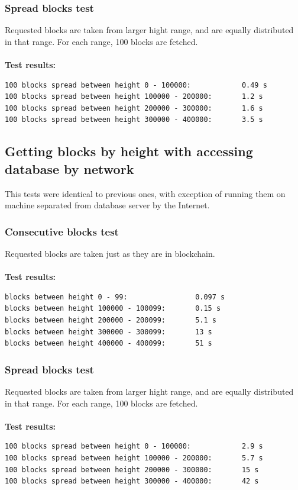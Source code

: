 \documentclass[12pt, en, eng, oneside, final]{mgr}
\begin{document}
\subsubsection{Spread blocks test}
Requested blocks are taken from larger hight range, and are equally distributed in that range. For each range, 100 blocks are fetched.
\\
\\ 
\textbf{Test results:}
\begin{verbatim}
100 blocks spread between height 0 - 100000:            0.49 s
100 blocks spread between height 100000 - 200000:       1.2 s
100 blocks spread between height 200000 - 300000:       1.6 s
100 blocks spread between height 300000 - 400000:       3.5 s
\end{verbatim}


\subsection{Getting blocks by height with accessing database by network}
This tests were identical to previous ones, with exception of running them on machine separated from database server by the Internet.

\subsubsection{Consecutive blocks test}
Requested blocks are taken just as they are in blockchain.
\\
\\
\textbf{Test results:}
\begin{verbatim}
blocks between height 0 - 99:                0.097 s
blocks between height 100000 - 100099:       0.15 s
blocks between height 200000 - 200099:       5.1 s
blocks between height 300000 - 300099:       13 s
blocks between height 400000 - 400099:       51 s
\end{verbatim}

\subsubsection{Spread blocks test}
Requested blocks are taken from larger hight range, and are equally distributed in that range. For each range, 100 blocks are fetched.
\\
\\ 
\textbf{Test results:}
\begin{verbatim}
100 blocks spread between height 0 - 100000:            2.9 s
100 blocks spread between height 100000 - 200000:       5.7 s
100 blocks spread between height 200000 - 300000:       15 s
100 blocks spread between height 300000 - 400000:       42 s
\end{verbatim}
\end{document}
